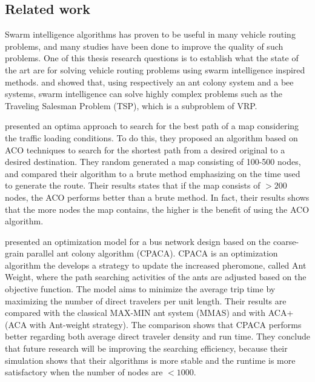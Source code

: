 \subsection{Related work}


Swarm intelligence algorithms has proven to be useful in many vehicle routing problems, and many studies have been done to improve the quality of such problems. One of this thesis research questions is to establish what the state of the art are for solving vehicle routing problems using swarm intelligence inspired methods. \citet{dorigo97} and \citet{lucic03} showed that, using respectively an ant colony system and a bee systems, swarm intelligence can solve highly complex problems such as the Traveling Salesman Problem (TSP), which is a subproblem of VRP. 

\citet{hsiao04} presented an optima approach to search for the best path of a map considering the traffic loading conditions. To do this, they proposed an algorithm based on ACO techniques to search for the shortest path from a desired original to a desired destination. They random generated a map consisting of 100-500 nodes, and compared their algorithm to a brute method emphasizing on the time used to generate the route. Their results states that if the map consists of $>200$ nodes, the ACO performs better than a brute method. In fact, their results shows that the more nodes the map contains, the higher is the benefit of using the ACO algorithm. 

\citet{yang07} presented an optimization model for a bus network design based on the coarse-grain parallel ant colony algorithm (CPACA). CPACA is an optimization algorithm the develops a strategy to update the increased pheromone, called Ant Weight, where the path searching activities of the ants are adjusted based on the objective function. The model aims to minimize the average trip time by maximizing the number of direct travelers per unit length. Their results are compared with the classical MAX-MIN ant system (MMAS)\citep{stutzle99} and with ACA+ (ACA with Ant-weight strategy). The comparison shows that CPACA performs better regarding both average direct traveler density and run time. They conclude that future research will be improving the searching efficiency, because their simulation shows that their algorithms is more stable and the runtime is more satisfactory when the number of nodes are $<1000$. 

